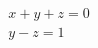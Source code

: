 \documentclass{article}
\begin{document}
\thispagestyle{empty}
\setcounter{equation}{1}
\begin{gather}
  x + y + z = 0 \\
  y - z = 1 
\end{gather}
\end{document}
